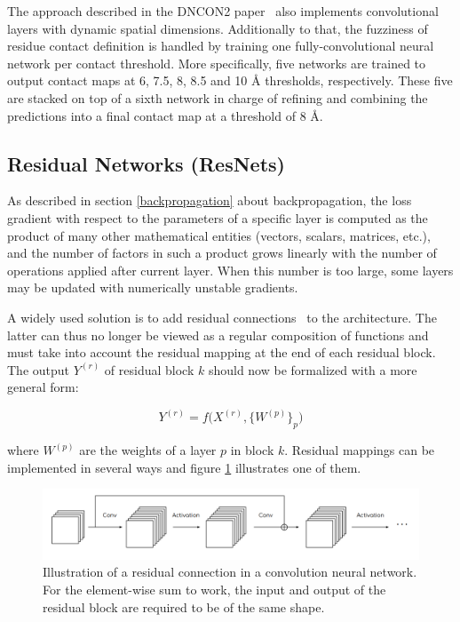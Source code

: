         The approach described in the DNCON2 paper~\cite{doi:10.1093/bioinformatics/bty341}
        also implements convolutional layers with dynamic spatial dimensions.
        Additionally to that, the fuzziness of residue contact definition is handled
        by training one fully-convolutional neural network per contact threshold.
        More specifically, five networks are trained to output contact maps at 6, 7.5, 8, 8.5 and 10 \AA{}
        thresholds, respectively. These five are stacked on top of a sixth network in charge
        of refining and combining the predictions into a final contact map at a threshold of 8 \AA{}.

    \subsection{Residual Networks (ResNets)}

        As described in section \ref{backpropagation} about backpropagation,
        the loss gradient with respect to the parameters of a specific layer
        is computed as the product of many other mathematical entities
        (vectors, scalars, matrices, etc.), and the number of factors in such
        a product grows linearly with the number of operations applied after
        current layer. When this number is too large, some layers may be
        updated with numerically unstable gradients.

        A widely used solution is to add
        residual connections~\cite{DBLP:journals/corr/HeZRS15}
        to the architecture. The latter can thus no longer be viewed as
        a regular composition of functions and must take into account
        the residual mapping at the end of each residual block.
        The output $Y^{(r)}$ of residual block $k$ should now
        be formalized with a more general form:

        \begin{equation}
            Y^{(r)} = f\big(X^{(r)}, \{W^{(p)}\}_p\big)
        \end{equation}

        where $W^{(p)}$ are the weights of a layer $p$ in block $k$.
        Residual mappings can be implemented in several ways and figure \ref{resnet}
        illustrates one of them.

        \begin{figure}[H]
            \begin{center}
                \includegraphics[width=\textwidth, keepaspectratio]{imgs/resnet.png}
                \caption{Illustration of a residual connection in a convolution
                neural network. For the element-wise sum to work, the input and output
                of the residual block are required to be of the same shape.}
                \label{resnet}
            \end{center}
        \end{figure}

